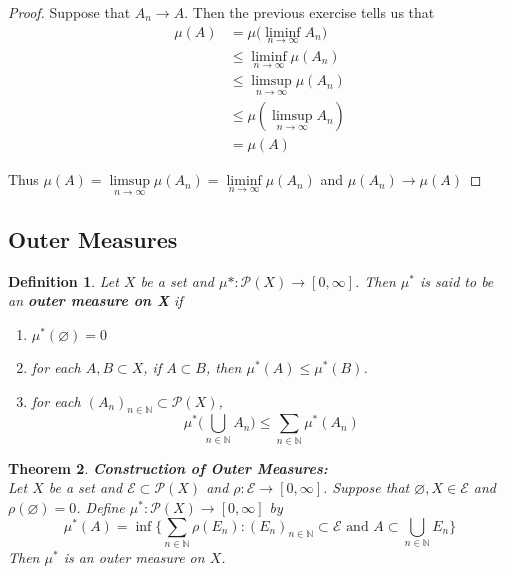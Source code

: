 \documentclass[12pt]{amsart}
\newtheorem{thm}{Theorem}[subsection]
\newtheorem{defn}[thm]{Definition}
\newcommand{\N}{\mathbb{N}}
\newcommand{\MP}{\mathcal{P}}
\newcommand{\ME}{\mathcal{E}}
\begin{document}
\begin{proof}
	Suppose that $A_n \rightarrow A$. Then the previous exercise tells us that 
	\begin{align*}
		\mu(A)
		&= \mu\bigg(\liminf\limits_{n \rightarrow \infty}A_n \bigg)\\
		& \leq \liminf_{n \rightarrow \infty} \mu(A_n)\\
		& \leq \limsup_{n \rightarrow \infty}\mu (A_n) \\
		& \leq \mu( \limsup_{n \rightarrow \infty} A_n) \\
		&= \mu (A)
	\end{align*}
	
	Thus $\mu(A) = \limsup\limits_{n \rightarrow \infty}\mu(A_n) = \liminf\limits_{n \rightarrow \infty}\mu(A_n)$ and $\mu(A_n) \rightarrow \mu(A)$
\end{proof}


















\subsection{Outer Measures}

\begin{defn}
	Let $X$ be a set and $\mu* : \MP(X) \rightarrow [0, \infty]$. Then $\mu^*$ is said to be an \textbf{outer measure on X} if 
	\begin{enumerate}
		\item $\mu^*(\varnothing) = 0$
		\item for each $A,B \subset X $, if $A \subset B$, then $\mu^*(A) \leq \mu^*(B)$.
		\item for each $(A_n)_{n \in \N} \subset \MP(X)$, $$\mu^*\big(\bigcup\limits_{n \in \N} A_n\big) \leq \sum\limits_{n \in \N}\mu^*(A_n) $$
	\end{enumerate}
\end{defn}

\begin{thm}\textbf{Construction of Outer Measures:} \\
	Let $X$ be a set and $\ME \subset \MP(X)$ and $\rho: \ME \rightarrow [0, \infty]$. Suppose that $\varnothing, X \in \ME$ and $\rho(\varnothing) = 0$. Define $\mu^*:\MP(X) \rightarrow [0, \infty]$ by $$\mu^*(A) = \inf \bigg \{\sum_{n \in \N}\rho(E_n): (E_n)_{n \in \N} \subset \ME \text{ and }A \subset \bigcup_{n \in \N}E_n \bigg \}$$ Then $\mu^*$ is an outer measure on $X$.
\end{thm}
\end{document}

